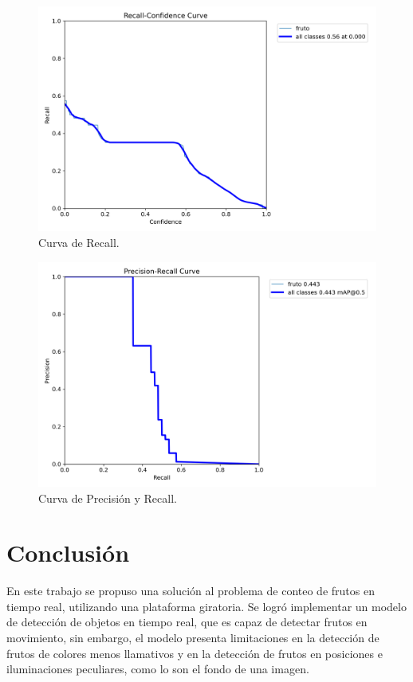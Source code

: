 \documentclass[conference]{IEEEtran}
\begin{document}
\begin{figure}[ht]
    \centering
    \includegraphics[width=\columnwidth]{images/R_curve.png}
    \caption{Curva de Recall.}
    \label{fig:R_curve}
\end{figure}

\begin{figure}[ht]
    \centering
    \includegraphics[width=\columnwidth]{images/PR_curve.png}
    \caption{Curva de Precisión y Recall.}
    \label{fig:PR_curve}
\end{figure}


\section{Conclusión}
En este trabajo se propuso una solución al problema de conteo de frutos en tiempo real, utilizando una plataforma giratoria. Se logró implementar un modelo de detección de objetos en tiempo real, que es capaz de detectar frutos en movimiento, sin embargo, el modelo presenta limitaciones en la detección de frutos de colores menos llamativos y en la detección de frutos en posiciones e iluminaciones peculiares, como lo son el fondo de una imagen.


\nocite{*}
\printbibliography
\end{document}
